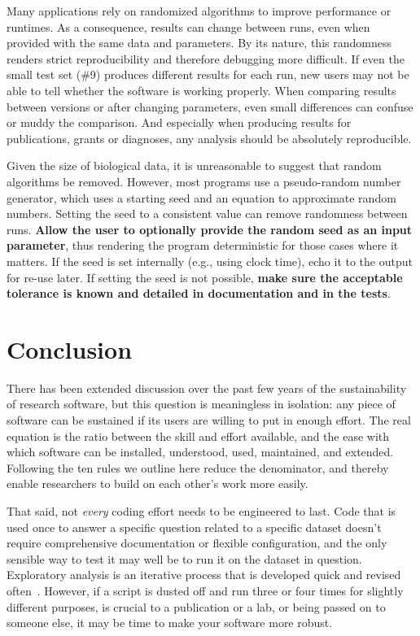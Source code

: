 \documentclass[10pt,letterpaper]{article}
\newcommand{\ruleminor}[1]{\textbf{#1}}
\begin{document}
Many applications rely on randomized algorithms to improve performance
or runtimes. As a consequence, results can change between runs, even
when provided with the same data and parameters. By its nature, this
randomness renders strict reproducibility and therefore debugging more
difficult. If even the small test set (\#9) produces different results
for each run, new users may not be able to tell whether the software
is working properly. When comparing results between versions or after
changing parameters, even small differences can confuse or muddy the
comparison. And especially when producing results for publications,
grants or diagnoses, any analysis should be absolutely reproducible.

Given the size of biological data, it is unreasonable to suggest that
random algorithms be removed. However, most programs use a
pseudo-random number generator, which uses a starting seed and an
equation to approximate random numbers. Setting the seed to a
consistent value can remove randomness between runs. \ruleminor{Allow
the user to optionally provide the random seed as an input
parameter}, thus rendering the program deterministic for those cases
where it matters. If the seed is set internally (e.g., using clock
time), echo it to the output for re-use later.  If setting the seed is
not possible, \ruleminor{make sure the acceptable tolerance is known
and detailed in documentation and in the tests}.

\section*{Conclusion}

There has been extended discussion over the past few years of the
sustainability of research software, but this question is meaningless
in isolation: any piece of software can be sustained if its users are
willing to put in enough effort.  The real equation is the ratio
between the skill and effort available, and the ease with which
software can be installed, understood, used, maintained, and extended.
Following the ten rules we outline here reduce the denominator, and
thereby enable researchers to build on each other's work more easily.

That said, not \emph{every} coding effort needs to be engineered to
last.  Code that is used once to answer a specific question related to
a specific dataset doesn't require comprehensive documentation or
flexible configuration, and the only sensible way to test it may well
be to run it on the dataset in question. Exploratory analysis is an
iterative process that is developed quick and revised
often~\cite{lawlor2015,sanders2008}.  However, if a script is dusted
off and run three or four times for slightly different purposes, is
crucial to a publication or a lab, or being passed on to someone else,
it may be time to make your software more robust.
\end{document}
